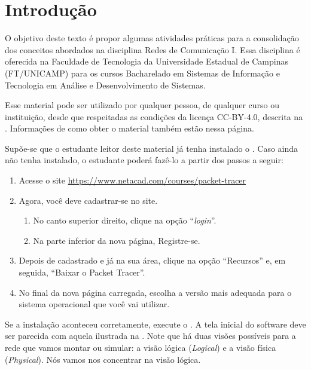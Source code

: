\chapter{Introdução}\label{chp:introducao}
O objetivo deste texto é propor algumas atividades práticas para a consolidação dos conceitos abordados na disciplina Redes de Comunicação I. Essa disciplina é oferecida na Faculdade de Tecnologia da Universidade Estadual de Campinas (FT/UNICAMP) para os cursos Bacharelado em Sistemas de Informação e Tecnologia em Análise e Desenvolvimento de Sistemas.

Esse material pode ser utilizado por qualquer pessoa, de qualquer curso ou instituição, desde que respeitadas as condições da licença CC-BY-4.0, descrita na . Informações de como obter o material também estão nessa página.

Supõe-se que o estudante leitor deste material já tenha instalado o \CPT. Caso ainda não tenha instalado, o estudante poderá fazê-lo a partir dos passos a seguir:

\begin{enumerate}[label*=\arabic*.]
    \item Acesse o site \url{https://www.netacad.com/courses/packet-tracer}
    \item Agora, você deve cadastrar-se no site.
    \begin{enumerate}[label*=\arabic*.]
        \item No canto superior direito, clique na opção \enquote{\textit{login}}.
        \item Na parte inferior da nova página, Registre-se.
    \end{enumerate}
    \item Depois de cadastrado e já na sua área, clique na opção \enquote{Recursos} e, em seguida, \enquote{Baixar o Packet Tracer}.
    \item No final da nova página carregada, escolha a versão mais adequada para o sistema operacional que você vai utilizar.
\end{enumerate}

Se a instalação aconteceu corretamente, execute o \CPT. A tela inicial do software deve ser parecida com aquela ilustrada na . Note que há duas visões possíveis para a rede que vamos montar ou simular: a visão lógica (\textit{Logical}) e a visão física (\textit{Physical}). Nós vamos nos concentrar na visão lógica.


